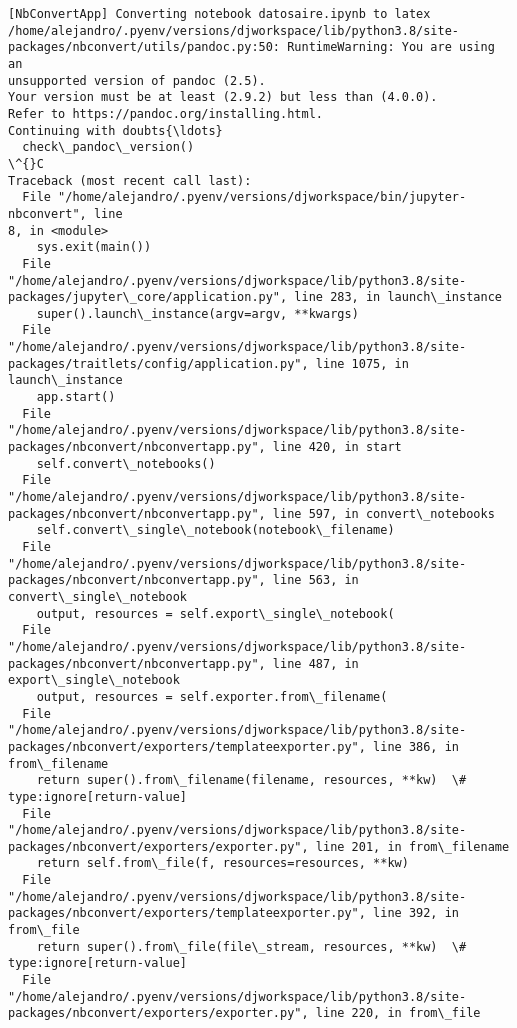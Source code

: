 \documentclass[11pt]{article}
\begin{document}
    \begin{Verbatim}[commandchars=\\\{\}]
[NbConvertApp] Converting notebook datosaire.ipynb to latex
/home/alejandro/.pyenv/versions/djworkspace/lib/python3.8/site-
packages/nbconvert/utils/pandoc.py:50: RuntimeWarning: You are using an
unsupported version of pandoc (2.5).
Your version must be at least (2.9.2) but less than (4.0.0).
Refer to https://pandoc.org/installing.html.
Continuing with doubts{\ldots}
  check\_pandoc\_version()
\^{}C
Traceback (most recent call last):
  File "/home/alejandro/.pyenv/versions/djworkspace/bin/jupyter-nbconvert", line
8, in <module>
    sys.exit(main())
  File "/home/alejandro/.pyenv/versions/djworkspace/lib/python3.8/site-
packages/jupyter\_core/application.py", line 283, in launch\_instance
    super().launch\_instance(argv=argv, **kwargs)
  File "/home/alejandro/.pyenv/versions/djworkspace/lib/python3.8/site-
packages/traitlets/config/application.py", line 1075, in launch\_instance
    app.start()
  File "/home/alejandro/.pyenv/versions/djworkspace/lib/python3.8/site-
packages/nbconvert/nbconvertapp.py", line 420, in start
    self.convert\_notebooks()
  File "/home/alejandro/.pyenv/versions/djworkspace/lib/python3.8/site-
packages/nbconvert/nbconvertapp.py", line 597, in convert\_notebooks
    self.convert\_single\_notebook(notebook\_filename)
  File "/home/alejandro/.pyenv/versions/djworkspace/lib/python3.8/site-
packages/nbconvert/nbconvertapp.py", line 563, in convert\_single\_notebook
    output, resources = self.export\_single\_notebook(
  File "/home/alejandro/.pyenv/versions/djworkspace/lib/python3.8/site-
packages/nbconvert/nbconvertapp.py", line 487, in export\_single\_notebook
    output, resources = self.exporter.from\_filename(
  File "/home/alejandro/.pyenv/versions/djworkspace/lib/python3.8/site-
packages/nbconvert/exporters/templateexporter.py", line 386, in from\_filename
    return super().from\_filename(filename, resources, **kw)  \#
type:ignore[return-value]
  File "/home/alejandro/.pyenv/versions/djworkspace/lib/python3.8/site-
packages/nbconvert/exporters/exporter.py", line 201, in from\_filename
    return self.from\_file(f, resources=resources, **kw)
  File "/home/alejandro/.pyenv/versions/djworkspace/lib/python3.8/site-
packages/nbconvert/exporters/templateexporter.py", line 392, in from\_file
    return super().from\_file(file\_stream, resources, **kw)  \#
type:ignore[return-value]
  File "/home/alejandro/.pyenv/versions/djworkspace/lib/python3.8/site-
packages/nbconvert/exporters/exporter.py", line 220, in from\_file

\end{Verbatim}
\end{document}
